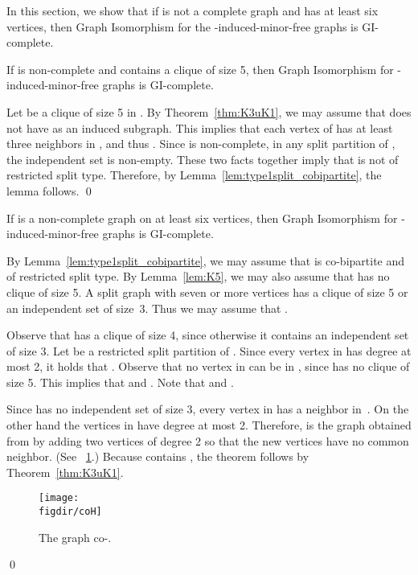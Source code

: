 \documentclass[envcountsame,envcountsect,11pt,a4paper]{llncs}
\renewenvironment{proof}{\begin{Proof}}{\qed\end{Proof}}
\newcommand{\figref}[1]{\figurename~\ref{#1}}
\newcommand{\figdir}{.}
\begin{document}
In this section, we show that if  is not a complete graph and has at least six vertices,
then {\sc Graph Isomorphism} for the -induced-minor-free graphs is GI-complete.
\begin{lemma}
\label{lem:K5}
If  is non-complete and contains a clique of size 5,
then {\sc Graph Isomorphism} for -induced-minor-free graphs is GI-complete.
\end{lemma}
\begin{proof}
Let  be a clique of size 5 in .
By Theorem~\ref{thm:K3uK1}, we may assume that  does not have  as an induced subgraph.
This implies that each vertex of  has at least three neighbors in , and thus .
Since  is non-complete, in any split partition  of , the independent set   is non-empty.
These two facts together imply that  is not of restricted split type.
Therefore, by Lemma~\ref{lem:type1split_cobipartite}, the lemma follows.
\end{proof}

\begin{theorem}
If  is a non-complete graph on at least six vertices,
then {\sc Graph Isomorphism} for -induced-minor-free graphs is GI-complete.
\end{theorem}
\begin{proof}
By Lemma~\ref{lem:type1split_cobipartite},
we may assume that  is co-bipartite and of restricted split type.
By Lemma~\ref{lem:K5}, we may also assume that  has no clique of size 5.
A split graph with seven or more vertices has a clique of size 5 or an independent set of size~3.
Thus we may assume that .

Observe that  has a clique  of size 4,
since otherwise it contains an independent set of size 3.
Let  be a restricted split partition of .
Since every vertex in  has degree at most 2, it holds that .
Observe that no vertex in  can be in , since  has no clique of size 5. 
This implies that  and . Note that  and .

Since  has no independent set of size 3,
every vertex in  has a neighbor in~.
On the other hand the vertices in  have degree at most 2.
Therefore,  is the graph obtained from  by adding two vertices of degree 2
so that the new vertices have no common neighbor. (See \figref{fig:coH}.)
Because  contains , the theorem follows by Theorem~\ref{thm:K3uK1}.
\begin{figure}[htb]
  \centering
  \texttt{[image: \\figdir/coH]}
  \caption{The graph co-.}
  \label{fig:coH}
\end{figure}
\end{proof}
\end{document}

